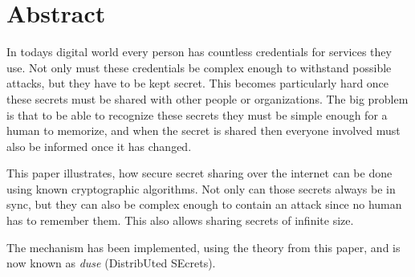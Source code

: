 \chapter*{Abstract}

In todays digital world every person has countless credentials for services
they use. Not only must these credentials be complex enough to withstand
possible attacks, but they have to be kept secret. This becomes particularly
hard once these secrets must be shared with other people or organizations. The
big problem is that to be able to recognize these secrets they must be simple
enough for a human to memorize, and when the secret is shared then everyone
involved must also be informed once it has changed.

This paper illustrates, how secure secret sharing over the internet can be done
using known cryptographic algorithms. Not only can those secrets always be in
sync, but they can also be complex enough to contain an attack since no human
has to remember them. This also allows sharing secrets of infinite size.

The mechanism has been implemented, using the theory from this paper, and is
now known as \textit{duse} (DistribUted SEcrets).
